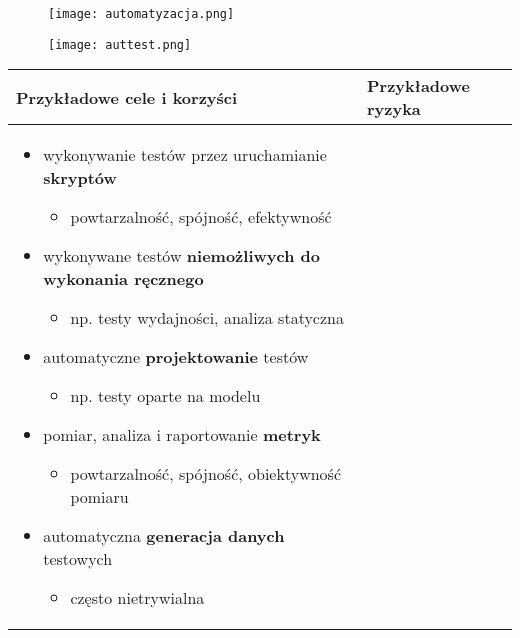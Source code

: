 \documentclass[../main.tex]{subfiles}
\begin{document}
    \begin{figure}[H]
        \texttt{[image: automatyzacja.png]}
    \end{figure}

    \begin{figure}[H]
        \texttt{[image: auttest.png]}
    \end{figure}

    \begin{table}[H]
        \begin{center}
            \begin{tabular}{| p{8cm} | p{8cm} |}
                \hline
                \textbf{Przykładowe cele i korzyści} & \textbf{Przykładowe ryzyka} \\
                \hline
                \begin{itemize}
                    \item wykonywanie testów przez uruchamianie \textbf{skryptów}
                    \begin{itemize}
                        \item powtarzalność, spójność, efektywność
                    \end{itemize}
                    \item wykonywane testów \textbf{niemożliwych do wykonania ręcznego}
                    \begin{itemize}
                        \item np. testy wydajności, analiza statyczna
                    \end{itemize}
                    \item automatyczne \textbf{projektowanie} testów
                    \begin{itemize}
                        \item np. testy oparte na modelu
                    \end{itemize}
                    \item pomiar, analiza i raportowanie \textbf{metryk}
                    \begin{itemize}
                        \item powtarzalność, spójność, obiektywność pomiaru
                    \end{itemize}
                    \item automatyczna \textbf{generacja danych} testowych
                    \begin{itemize}
                        \item często nietrywialna

\end{itemize}
\end{itemize}
\end{tabular}
\end{center}
\end{table}
\end{document}
